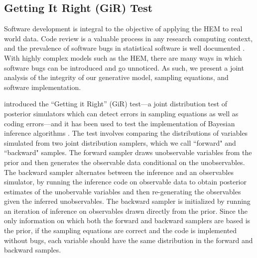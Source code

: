 \documentclass[ba]{imsart}
\numberwithin{equation}{section}
\theoremstyle{plain}
\begin{document}
\subsection{Getting It Right (GiR) Test} \label{subec:GiR}
  Software development is integral to the objective of applying the HEM to real world data. Code review is a valuable process in any research computing context, and the prevalence of software bugs in statistical software is well documented \citep[e.g., ][]{altman2004numerical,mccullough2009accuracy}.  With highly complex models such as the HEM, there are many ways in which software bugs can be introduced and go unnoticed. As such, we present a joint analysis of the integrity of our generative model, sampling equations, and software implementation. 
  
   \cite{geweke2004getting} introduced the ``Getting it Right'' (GiR) test---a joint distribution test of posterior simulators which can detect errors in sampling equations as well as coding errors---and it has been used to test the implementation of Bayesian inference algorithms \citep{zhao2016bayesian}.  The test involves comparing the distributions of variables simulated from two joint distribution samplers, which we call ``forward" and ``backward" samples. The forward sampler draws unobservable variables from the prior and then generates the observable data conditional on the unobservables. The backward sampler alternates between the inference and an observables simulator, by running the inference code on observable data to obtain posterior estimates of the unobervable variables and then re-generating the observables given the inferred unobservables. The backward sampler is initialized by running an iteration of inference on observables drawn directly from the prior. Since the only information on which both the forward and backward samplers are based is the prior, if the sampling equations are correct and the code is implemented without bugs, each variable should have the same distribution in the forward and backward samples.
   
\end{document}
